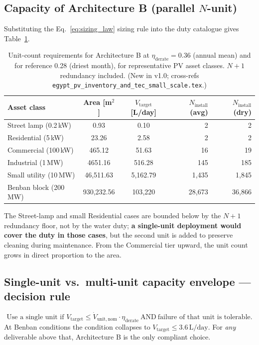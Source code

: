 \documentclass[11pt,a4paper]{article}
\newcommand{\SI}[2]{#1\,\ensuremath{\mathrm{#2}}}
\providecommand{\day}{day}
\providecommand{\liter}{L}
\begin{document}
\subsection{Capacity of Architecture B (parallel $N$-unit)}
Substituting the Eq.~\ref{eq:sizing_law} sizing rule into the duty catalogue gives Table~\ref{tab:unit_counts}.

\begin{table}[h]
\centering\small
\caption{Unit-count requirements for Architecture B at $\eta_{\mathrm{derate}}{=}0.36$ (annual mean) and for reference 0.28 (driest month), for representative PV asset classes. $N{+}1$ redundancy included. (New in v1.0; cross-refs \texttt{egypt\_pv\_inventory\_and\_tec\_small\_scale.tex}.)}
\label{tab:unit_counts}
\begin{tabular}{@{}lccrr@{}}
\toprule
\textbf{Asset class} & \textbf{Area [m$^2$]} & \textbf{$V_{\mathrm{target}}$ [L/day]} & \textbf{$N_{\mathrm{install}}$ (avg)} & \textbf{$N_{\mathrm{install}}$ (dry)}\\
\midrule
Street lamp (0.2\,kW)         & 0.93       & 0.10       & 2          & 2 \\
Residential (5\,kW)           & 23.26      & 2.58       & 2          & 2 \\
Commercial (100\,kW)          & 465.12     & 51.63      & 16         & 19 \\
Industrial (1\,MW)            & 4651.16    & 516.28     & 145        & 185 \\
Small utility (10\,MW)        & 46{,}511.63 & 5{,}162.79  & 1{,}435     & 1{,}845 \\
Benban block (200\,MW)        & 930{,}232.56 & 103{,}220   & 28{,}673    & 36{,}866 \\
\bottomrule
\end{tabular}
\end{table}

\noindent
The Street-lamp and small Residential cases are bounded below by the $N{+}1$ redundancy floor, not by the water duty; \textbf{a single-unit deployment would cover the duty in those cases}, but the second unit is added to preserve cleaning during maintenance. From the Commercial tier upward, the unit count grows in direct proportion to the area.

\subsection{Single-unit vs.\ multi-unit capacity envelope --- decision rule}
\begin{equation}
\boxed{\;
\text{Use a single unit if } V_{\mathrm{target}} \le \dot{V}_{\mathrm{unit,nom}}\cdot\eta_{\mathrm{derate}}
\ \text{AND}\ \text{failure of that unit is tolerable.}
\;}
\end{equation}
At Benban conditions the condition collapses to $V_{\mathrm{target}}\le \SI{3.6}{\liter/\day}$. For \emph{any} deliverable above that, Architecture B is the only compliant choice.
\end{document}
